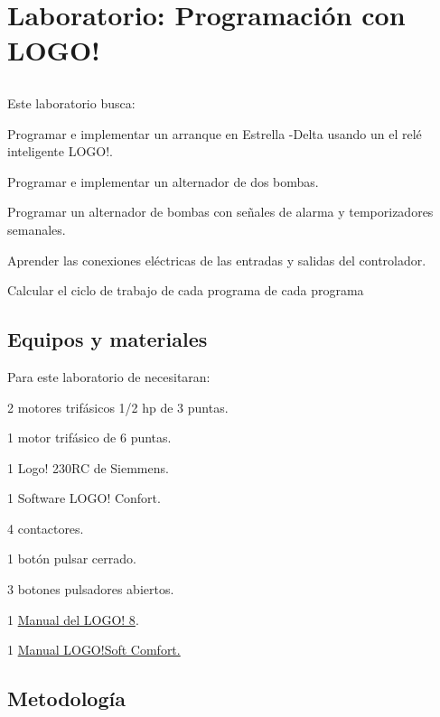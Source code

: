 \chapter{Laboratorio:  Programación con LOGO!}
	  
\section{\obj}
Este  laboratorio busca:
\begin{itemize}
	{\small
    \item Programar e implementar un arranque en Estrella -Delta usando un el relé inteligente LOGO!.
    \item Programar e implementar un alternador de dos bombas.
    \item Programar un alternador de bombas con señales de alarma y temporizadores semanales.
    \item Aprender las conexiones eléctricas de las entradas y salidas del controlador.
    \item Calcular el ciclo de trabajo de cada programa de cada programa 
 }
\end{itemize} 

 
\section{Equipos y materiales}
Para este laboratorio de necesitaran:
\begin{itemize}
	{\small \item 2 motores trifásicos 1/2 hp de 3 puntas.
		\item 1 motor trifásico de 6 puntas.
	\item 1 Logo! 230RC de Siemmens.
	\item 1 Software LOGO! Confort.
	\item 4 contactores.
	\item 1 botón pulsar cerrado.
	\item 3 botones pulsadores abiertos.
	\item 1 \href{https://cache.industry.siemens.com/dl/files/041/109741041/att_924629/v1/logo_system_manual_es-ES_es-ES.pdf}{Manual del LOGO! 8}.
	\item 1 \href{https://cache.industry.siemens.com/dl/files/807/100782807/att_924633/v1/Help_es-ES_es-ES.pdf}{Manual LOGO!Soft Comfort.}
}
\end{itemize}

\section{Metodología}


